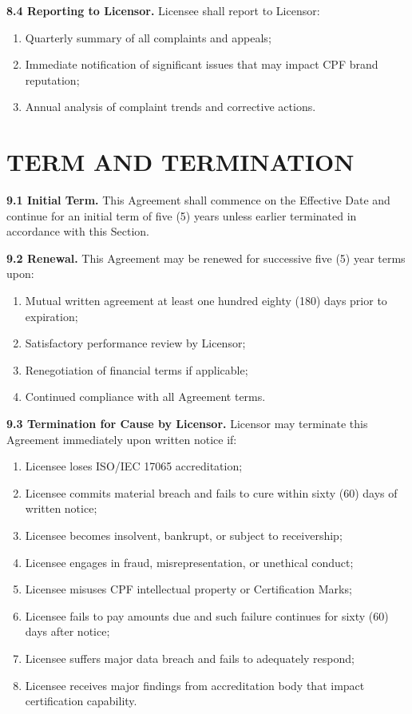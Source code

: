 \documentclass[11pt,a4paper]{article}
\begin{document}
\textbf{8.4 Reporting to Licensor.} Licensee shall report to Licensor:

\begin{enumerate}[label=\alph*)]
\item Quarterly summary of all complaints and appeals;
\item Immediate notification of significant issues that may impact CPF brand reputation;
\item Annual analysis of complaint trends and corrective actions.
\end{enumerate}

\section{TERM AND TERMINATION}

\textbf{9.1 Initial Term.} This Agreement shall commence on the Effective Date and continue for an initial term of five (5) years unless earlier terminated in accordance with this Section.

\textbf{9.2 Renewal.} This Agreement may be renewed for successive five (5) year terms upon:

\begin{enumerate}[label=\alph*)]
\item Mutual written agreement at least one hundred eighty (180) days prior to expiration;
\item Satisfactory performance review by Licensor;
\item Renegotiation of financial terms if applicable;
\item Continued compliance with all Agreement terms.
\end{enumerate}

\textbf{9.3 Termination for Cause by Licensor.} Licensor may terminate this Agreement immediately upon written notice if:

\begin{enumerate}[label=\alph*)]
\item Licensee loses ISO/IEC 17065 accreditation;
\item Licensee commits material breach and fails to cure within sixty (60) days of written notice;
\item Licensee becomes insolvent, bankrupt, or subject to receivership;
\item Licensee engages in fraud, misrepresentation, or unethical conduct;
\item Licensee misuses CPF intellectual property or Certification Marks;
\item Licensee fails to pay amounts due and such failure continues for sixty (60) days after notice;
\item Licensee suffers major data breach and fails to adequately respond;
\item Licensee receives major findings from accreditation body that impact certification capability.
\end{enumerate}
\end{document}
